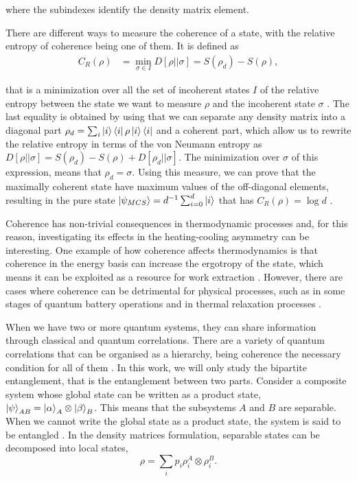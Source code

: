\noindent where the subindexes identify the density matrix element. 

There are different ways to measure the coherence of a state, with the relative entropy of coherence being one of them. It is defined as \begin{equation}
    \begin{split}
        C_R ({\rho}) &= \min_{{\sigma} \in I} D[{\rho} || {\sigma}] = S({\rho}_d) - S({\rho}),
    \end{split}
    \label{eq:relative-coherence}
\end{equation}

\noindent that is a minimization over all the set of incoherent states $I$ of the relative entropy between the state we want to measure ${\rho}$ and the incoherent state ${\sigma}$ \cite{streltsov-2017, baumgratz-2014}. The last equality is obtained by using that we can separate any density matrix into a diagonal part ${\rho}_d = \sum_i \ket{i}\bra{i} {\rho} \ket{i}\bra{i}$ and a coherent part, which allow us to rewrite the relative entropy in terms of the von Neumann entropy as $D[{\rho} || {\sigma}] = S({\rho}_d) - S({\rho}) + D[{\rho}_d || {\sigma}]$. The minimization over ${\sigma}$ of this expression, means that ${\rho}_d = {\sigma}$. Using this measure, we can prove that the maximally coherent state have maximum values of the off-diagonal elements, resulting in the pure state $\ket{\psi_{MCS}} = d^{-1} \sum_{i=0}^{d} \ket{i}$ that has $C_R ({\rho}) = \log d$ \cite{baumgratz-2014}.

Coherence has non-trivial consequences in thermodynamic processes and, for this reason, investigating its effects in the heating-cooling asymmetry can be interesting. One example of how coherence affects thermodynamics is that coherence in the energy basis can increase the ergotropy of the state, which means it can be exploited as a resource for work extraction \cite{francica-2020}. However, there are cases where coherence can be detrimental for physical processes, such as in some stages of quantum battery operations \cite{campaioli-2024} and in thermal relaxation processes \cite{krissia-2024}.

When we have two or more quantum systems, they can share information through classical and quantum correlations. There are a variety of quantum correlations that can be organised as a hierarchy, being coherence the necessary condition for all of them \cite{adesso-2016}. In this work, we will only study the bipartite entanglement, that is the entanglement between two parts. Consider a composite system whose global state can be written as a product state, $\ket{\psi}_{AB} = \ket{\alpha}_A \otimes \ket{\beta}_B$. This means that the subsystems $A$ and $B$ are separable. When we cannot write the global state as a product state, the system is said to be entangled \cite{adesso-2016}. In the density matrices formulation, separable states can be decomposed into local states,
\begin{equation}
    {\rho} = \sum_i p_i {\rho}_i^A \otimes {\rho}_i^B.
    \label{eq:rho-separavel}
\end{equation}

